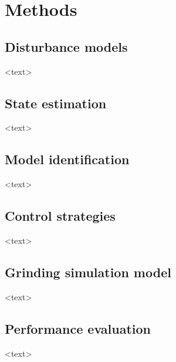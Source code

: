 \chapter{Methods}
\label{chap-methods}

\section{Disturbance models}

<text>


\section{State estimation}

<text>


\section{Model identification}


<text>


\section{Control strategies}

<text>


\section{Grinding simulation model}

<text>


\section{Performance evaluation}
	
<text>

